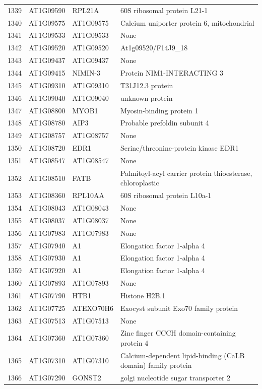 \documentclass[11pt]{article}
\begin{document}
\begin{center}
\begin{tabular}{rlll}
1339 & AT1G09590 & RPL21A & 60S ribosomal protein L21-1\\
1340 & AT1G09575 & AT1G09575 & Calcium uniporter protein 6, mitochondrial\\
1341 & AT1G09533 & AT1G09533 & None\\
1342 & AT1G09520 & AT1G09520 & At1g09520/F14J9\_18\\
1343 & AT1G09437 & AT1G09437 & None\\
1344 & AT1G09415 & NIMIN-3 & Protein NIM1-INTERACTING 3\\
1345 & AT1G09310 & AT1G09310 & T31J12.3 protein\\
1346 & AT1G09040 & AT1G09040 & unknown protein\\
1347 & AT1G08800 & MYOB1 & Myosin-binding protein 1\\
1348 & AT1G08780 & AIP3 & Probable prefoldin subunit 4\\
1349 & AT1G08757 & AT1G08757 & None\\
1350 & AT1G08720 & EDR1 & Serine/threonine-protein kinase EDR1\\
1351 & AT1G08547 & AT1G08547 & None\\
1352 & AT1G08510 & FATB & Palmitoyl-acyl carrier protein thioesterase, chloroplastic\\
1353 & AT1G08360 & RPL10AA & 60S ribosomal protein L10a-1\\
1354 & AT1G08043 & AT1G08043 & None\\
1355 & AT1G08037 & AT1G08037 & None\\
1356 & AT1G07983 & AT1G07983 & None\\
1357 & AT1G07940 & A1 & Elongation factor 1-alpha 4\\
1358 & AT1G07930 & A1 & Elongation factor 1-alpha 4\\
1359 & AT1G07920 & A1 & Elongation factor 1-alpha 4\\
1360 & AT1G07893 & AT1G07893 & None\\
1361 & AT1G07790 & HTB1 & Histone H2B.1\\
1362 & AT1G07725 & ATEXO70H6 & Exocyst subunit Exo70 family protein\\
1363 & AT1G07513 & AT1G07513 & None\\
1364 & AT1G07360 & AT1G07360 & Zinc finger CCCH domain-containing protein 4\\
1365 & AT1G07310 & AT1G07310 & Calcium-dependent lipid-binding (CaLB domain) family protein\\
1366 & AT1G07290 & GONST2 & golgi nucleotide sugar transporter 2\\

\end{tabular}
\end{center}
\end{document}
